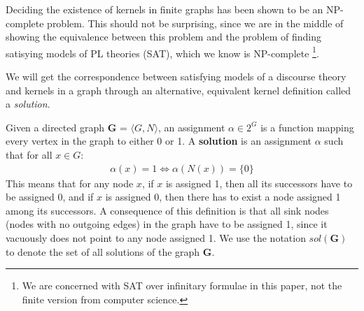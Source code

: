 Deciding the existence of kernels in finite graphs has been shown to be an NP-complete problem\cite{chvatal}.
This should not be surprising, since we are in the middle of showing the equivalence between this problem and the problem of finding satisying models of PL theories (SAT), which we know is NP-complete \footnote{We are concerned with SAT over infinitary formulae in this paper, not the finite version from computer science.}.

We will get the correspondence between satisfying models of a discourse theory and kernels in a graph through an alternative, equivalent kernel definition called a \textit{solution}.

Given a directed graph \textbf{G} = $\langle G,N \rangle$, an assignment $\alpha \in 2^G$ is a function mapping every vertex in the graph to either 0 or 1.
A \textbf{solution} is an assignment $\alpha$ such that for all $x \in G:$
\begin{align}
  \alpha(x) = 1 \iff \alpha(N(x)) = \{ 0 \}
\end{align}
This means that for any node $x$, if $x$ is assigned 1, then all its successors have to be assigned  0, and if $x$ is assigned 0, then there has to exist a node assigned 1 among its successors.
A consequence of this definition is that all sink nodes (nodes with no outgoing edges) in the graph have to be assigned 1, since it vacuously does not point to any node assigned 1.
We use the notation $sol(\mathbf{G})$ to denote the set of all solutions of the graph \textbf{G}.
